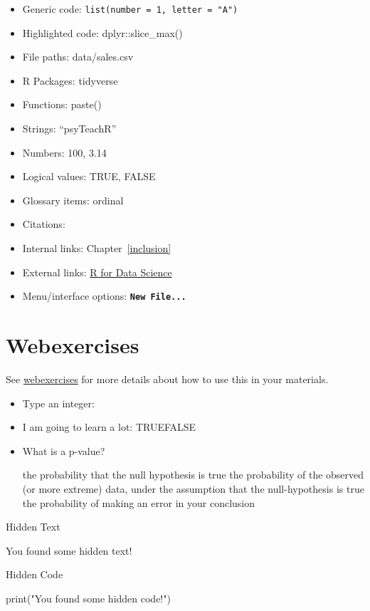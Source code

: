 \documentclass[
  oneside]{book}
\newenvironment{Shaded}{\begin{snugshade}}{\end{snugshade}}
\newcommand{\FunctionTok}[1]{\textcolor[rgb]{0.00,0.00,0.00}{#1}}
\newcommand{\NormalTok}[1]{#1}
\newcommand{\StringTok}[1]{\textcolor[rgb]{0.31,0.60,0.02}{#1}}
\providecommand{\tightlist}{%
  \setlength{\itemsep}{0pt}\setlength{\parskip}{0pt}}
\begin{document}
\begin{itemize}
\tightlist
\item
  Generic code: \texttt{list(number\ =\ 1,\ letter\ =\ "A")}
\item
  Highlighted code: {dplyr}{::}{slice\_max}{(}{)}
\item
  File paths: data/sales.csv
\item
  R Packages: tidyverse
\item
  Functions: {paste}{(}{)}
\item
  Strings: {``psyTeachR''}
\item
  Numbers: {100}, {3.14}
\item
  Logical values: {TRUE}, {FALSE}
\item
  Glossary items: ordinal
\item
  Citations: \citet{R-tidyverse}
\item
  Internal links: Chapter~\ref{inclusion}
\item
  External links: \href{https://r4ds.had.co.nz/}{R for Data Science}
\item
  Menu/interface options: \textbf{\texttt{New\ File...}}
\end{itemize}

\hypertarget{webexercises}{%
\section{Webexercises}\label{webexercises}}

See \href{https://psyteachr.github.io/webexercises/}{webexercises} for more details about how to use this in your materials.

\begin{itemize}
\tightlist
\item
  Type an integer:
\item
  I am going to learn a lot: TRUEFALSE
\item
  What is a p-value?

  \hypertarget{radio_LLQBBPYUJJ}{}
  {the probability that the null hypothesis is true} {the probability of the observed (or more extreme) data, under the assumption that the null-hypothesis is true} {the probability of making an error in your conclusion}
\end{itemize}

Hidden Text

You found some hidden text!

Hidden Code

\begin{Shaded}
\begin{Highlighting}[]
\FunctionTok{print}\NormalTok{(}\StringTok{"You found some hidden code!"}\NormalTok{)}
\end{Highlighting}
\end{Shaded}
\end{document}
